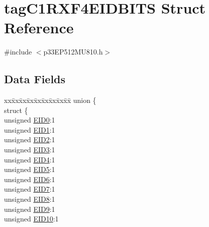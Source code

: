 \hypertarget{structtag_c1_r_x_f4_e_i_d_b_i_t_s}{}\section{tag\+C1\+R\+X\+F4\+E\+I\+D\+B\+I\+TS Struct Reference}
\label{structtag_c1_r_x_f4_e_i_d_b_i_t_s}


{\ttfamily \#include $<$p33\+E\+P512\+M\+U810.\+h$>$}

\subsection*{Data Fields}
\begin{DoxyCompactItemize}
\item 
\begin{tabbing}
xx\=xx\=xx\=xx\=xx\=xx\=xx\=xx\=xx\=\kill
union \{\\
\>struct \{\\
\>\>unsigned \hyperlink{structtag_c1_r_x_f4_e_i_d_b_i_t_s_a9da8b7b30247e4f9cd8cc056549aa9fd}{EID0}:1\\
\>\>unsigned \hyperlink{structtag_c1_r_x_f4_e_i_d_b_i_t_s_afd6c139491d147c1262f3d051c6691e9}{EID1}:1\\
\>\>unsigned \hyperlink{structtag_c1_r_x_f4_e_i_d_b_i_t_s_a36ec62d8d3c5acd5d15e6691dc099a94}{EID2}:1\\
\>\>unsigned \hyperlink{structtag_c1_r_x_f4_e_i_d_b_i_t_s_ab895f7d0ac289a0383b607cbc62eebe2}{EID3}:1\\
\>\>unsigned \hyperlink{structtag_c1_r_x_f4_e_i_d_b_i_t_s_a136d5a709d6618d40acceccb43036656}{EID4}:1\\
\>\>unsigned \hyperlink{structtag_c1_r_x_f4_e_i_d_b_i_t_s_a8dffb2d86a6c184df505ae7c71a58710}{EID5}:1\\
\>\>unsigned \hyperlink{structtag_c1_r_x_f4_e_i_d_b_i_t_s_af8a8574102515d8f1a4b7fd1685d0532}{EID6}:1\\
\>\>unsigned \hyperlink{structtag_c1_r_x_f4_e_i_d_b_i_t_s_a84c3262e67f8d5fd387ac10bde6fa9b1}{EID7}:1\\
\>\>unsigned \hyperlink{structtag_c1_r_x_f4_e_i_d_b_i_t_s_acca25e0b7d86eb499d01f85222baea87}{EID8}:1\\
\>\>unsigned \hyperlink{structtag_c1_r_x_f4_e_i_d_b_i_t_s_ac6748f73d4ada8538b06548be4f396c2}{EID9}:1\\
\>\>unsigned \hyperlink{structtag_c1_r_x_f4_e_i_d_b_i_t_s_a9cea8e77ecbb72bd3b08102412793725}{EID10}:1\\

\end{tabbing}
\end{DoxyCompactItemize}
